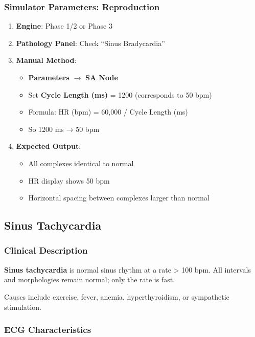\documentclass[12pt,a4paper,oneside]{book}
\begin{document}
\subsubsection{Simulator Parameters: Reproduction}

\begin{enumerate}
    \item \textbf{Engine}: Phase 1/2 or Phase 3
    \item \textbf{Pathology Panel}: Check ``Sinus Bradycardia''
    \item \textbf{Manual Method}:
    \begin{itemize}
        \item \textbf{Parameters} $\to$ \textbf{SA Node}
        \item Set \textbf{Cycle Length (ms)} = 1200 (corresponds to 50 bpm)
        \item Formula: HR (bpm) = 60,000 / Cycle Length (ms)
        \item So 1200 ms → 50 bpm
    \end{itemize}
    \item \textbf{Expected Output}:
    \begin{itemize}
        \item All complexes identical to normal
        \item HR display shows 50 bpm
        \item Horizontal spacing between complexes larger than normal
    \end{itemize}
\end{enumerate}

\subsection{Sinus Tachycardia}

\subsubsection{Clinical Description}

\textbf{Sinus tachycardia} is normal sinus rhythm at a rate > 100 bpm. All intervals and morphologies remain normal; only the rate is fast.

Causes include exercise, fever, anemia, hyperthyroidism, or sympathetic stimulation.

\subsubsection{ECG Characteristics}
\end{document}
